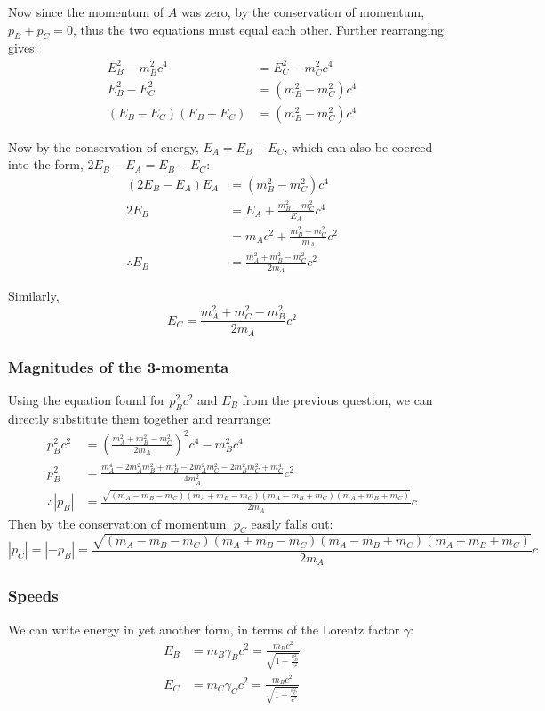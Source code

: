 \documentclass[a4paper]{scrartcl}
\begin{document}
Now since the momentum of \(A\) was zero, by the conservation of momentum, \(p_B + p_C = 0\), thus the two equations must equal each other. Further rearranging gives:
\begin{align*}
    E_B^2 - m_B^2 c^4 &= E_C^2 - m_C^2 c^4 \\
    E_B^2 - E_C^2 &= (m_B^2 - m_C^2) c^4 \\
    (E_B - E_C) (E_B + E_C) &= (m_B^2 - m_C^2) c^4
\end{align*}

Now by the conservation of energy, \(E_A = E_B + E_C\), which can also be coerced into the form, \(2 E_B - E_A = E_B - E_C\):
\begin{align*}
    (2 E_B - E_A) E_A &= (m_B^2 - m_C^2) c^4 \\
    2 E_B &= E_A + \frac{m_B^2 - m_C^2}{E_A} c^4 \\
    &= m_A c^2 + \frac{m_B^2 - m_C^2}{m_A} c^2 \\
    \therefore E_B &= \frac{m_A^2 + m_B^2 - m_C^2}{2 m_A} c^2
\end{align*}

Similarly,
\[E_C = \frac{m_A^2 + m_C^2 - m_B^2}{2 m_A} c^2\]

\subsubsection{Magnitudes of the 3-momenta}
Using the equation found for \(p_B^2 c^2\) and \(E_B\) from the previous question, we can directly substitute them together and rearrange:
\begin{align*}
    p_B^2 c^2 &= \left(\frac{m_A^2 + m_B^2 - m_C^2}{2 m_A}\right)^2 c^4 - m_B^2 c^4 \\
    p_B^2 &= \frac{m_A^4 - 2 m_A^2 m_B^2 + m_B^4 - 2 m_A^2 m_C^2 - 2 m_B^2 m_C^2 + m_C^4}{4 m_A^2} c^2 \\
    \therefore |p_B| &= \frac{\sqrt{(m_A - m_B - m_C) (m_A + m_B - m_C) (m_A - m_B + m_C) (m_A + m_B + m_C)}}{2 m_A} c
\end{align*}
Then by the conservation of momentum, \(p_C\) easily falls out:
\[|p_C| = |-p_B| = \frac{\sqrt{(m_A - m_B - m_C) (m_A + m_B - m_C) (m_A - m_B + m_C) (m_A + m_B + m_C)}}{2 m_A} c\]

\subsubsection{Speeds}
We can write energy in yet another form, in terms of the Lorentz factor \(\gamma\):
\begin{align*}
    E_B &= m_B \gamma_B c^2 = \frac{m_B c^2}{\sqrt{1 - \frac{v_B^2}{c^2}}} \\
    E_C &= m_C \gamma_C c^2 = \frac{m_B c^2}{\sqrt{1 - \frac{v_C^2}{c^2}}}
\end{align*}
\end{document}
